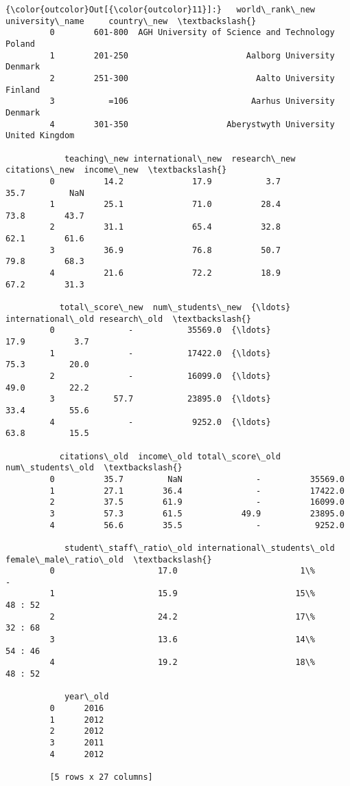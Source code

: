 \documentclass[11pt]{article}
\begin{document}
\begin{Verbatim}[commandchars=\\\{\}]
{\color{outcolor}Out[{\color{outcolor}11}]:}   world\_rank\_new                           university\_name     country\_new  \textbackslash{}
         0        601-800  AGH University of Science and Technology          Poland   
         1        201-250                        Aalborg University         Denmark   
         2        251-300                          Aalto University         Finland   
         3           =106                         Aarhus University         Denmark   
         4        301-350                    Aberystwyth University  United Kingdom   
         
            teaching\_new international\_new  research\_new  citations\_new  income\_new  \textbackslash{}
         0          14.2              17.9           3.7           35.7         NaN   
         1          25.1              71.0          28.4           73.8        43.7   
         2          31.1              65.4          32.8           62.1        61.6   
         3          36.9              76.8          50.7           79.8        68.3   
         4          21.6              72.2          18.9           67.2        31.3   
         
           total\_score\_new  num\_students\_new  {\ldots}  international\_old research\_old  \textbackslash{}
         0               -           35569.0  {\ldots}               17.9          3.7   
         1               -           17422.0  {\ldots}               75.3         20.0   
         2               -           16099.0  {\ldots}               49.0         22.2   
         3            57.7           23895.0  {\ldots}               33.4         55.6   
         4               -            9252.0  {\ldots}               63.8         15.5   
         
           citations\_old  income\_old total\_score\_old num\_students\_old  \textbackslash{}
         0          35.7         NaN               -          35569.0   
         1          27.1        36.4               -          17422.0   
         2          37.5        61.9               -          16099.0   
         3          57.3        61.5            49.9          23895.0   
         4          56.6        35.5               -           9252.0   
         
            student\_staff\_ratio\_old international\_students\_old  female\_male\_ratio\_old  \textbackslash{}
         0                     17.0                         1\%                      -   
         1                     15.9                        15\%                48 : 52   
         2                     24.2                        17\%                32 : 68   
         3                     13.6                        14\%                54 : 46   
         4                     19.2                        18\%                48 : 52   
         
            year\_old  
         0      2016  
         1      2012  
         2      2012  
         3      2011  
         4      2012  
         
         [5 rows x 27 columns]
\end{Verbatim}
            
\end{document}
